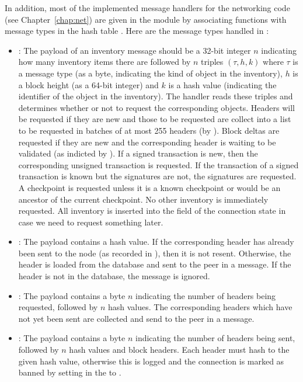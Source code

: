 In addition, most of the implemented message handlers for the networking code (see Chapter~\ref{chap:net})
are given in the {} module by associating functions with message types in
the hash table
{}.
Here are the message types handled in {}:
\begin{itemize}
\item {}: The payload of an inventory message should be a 32-bit integer $n$ indicating
how many inventory items there are followed by $n$ triples $(\tau,h,k)$
where $\tau$ is a message type (as a byte, indicating the kind of object in the inventory), $h$ is a block height (as a 64-bit integer)
and $k$ is a hash value (indicating the identifier of the object in the inventory).
The handler reads these triples and determines whether or not to request the corresponding objects.
Headers will be requested if they are new and those to be requested are collect into a list to be requested in batches of at most 255 headers (by {}).
Block deltas are requested if they are new and the corresponding header is waiting to be validated (as indicted by {}).
If a signed transaction is new, then the corresponding unsigned transaction is requested.
If the transaction of a signed transaction is known but the signatures are not, the signatures are requested.
A checkpoint is requested unless it is a known checkpoint or would be an ancestor of the current checkpoint.
No other inventory is immediately requested.
All inventory is inserted into the {} field of the connection state in case
we need to request something later.
\item {}: The payload contains a hash value.
If the corresponding header has already been sent to the node (as recorded in {}),
then it is not resent. Otherwise, the header is loaded from the database and sent to the peer in a {} message. If the header is not in the database, the message is ignored.
\item {}: The payload contains a byte $n$ indicating the number of headers being requested, followed by $n$ hash values.
The corresponding headers which have not yet been sent are collected and send to the peer in a {} message.
\item {}: The payload contains a byte $n$ indicating the number of headers being sent, followed by $n$ hash values and block headers.
Each header must hash to the given hash value, otherwise this is logged and the connection is marked as banned by setting {} in the {} to {}.

\end{itemize}
